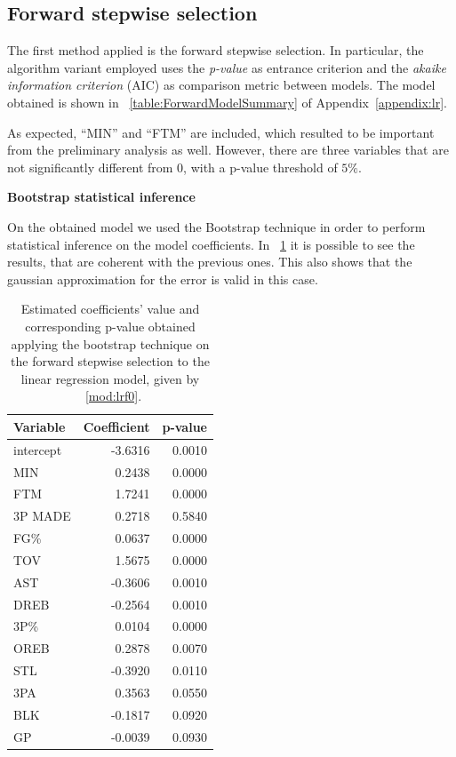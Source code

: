 \subsection{Forward stepwise selection}

The first method applied is the forward stepwise selection. In particular, the algorithm variant employed uses the \textit{p-value} as entrance criterion and the \textit{akaike information criterion} (AIC) as comparison metric between models. The model obtained is shown in \Tab~\ref{table:ForwardModelSummary} of Appendix~\ref{appendix:lr}.

As expected, ``MIN'' and ``FTM'' are included, which resulted to be important from the preliminary analysis as well. However, there are three variables that are not significantly different from 0, with a p-value threshold of $5\%$.

\vspace{0.2cm}
\noindent
\textbf{Bootstrap statistical inference}

On the obtained model we used the Bootstrap technique in order to perform statistical inference on the model coefficients. In \Tab~\ref{table:BootForwardModel} it is possible to see the results, that are coherent with the previous ones. This also shows that the gaussian approximation for the error is valid in this case. 

\begin{table}[h]
	\centering
	\begin{tabular}{|| l | r | r ||} 
		\hline
		Variable & Coefficient & p-value \\
		\hline
		\hline
		intercept & -3.6316 & 0.0010 \\
		MIN & 0.2438 & 0.0000 \\
		FTM & 1.7241 & 0.0000 \\
		3P MADE & 0.2718 & 0.5840 \\
		FG\% & 0.0637 & 0.0000 \\
		TOV & 1.5675 & 0.0000 \\
		AST & -0.3606 & 0.0010 \\
		DREB & -0.2564 & 0.0010 \\
		3P\% & 0.0104 & 0.0000 \\
		OREB & 0.2878 & 0.0070 \\
		STL & -0.3920 & 0.0110 \\
		3PA & 0.3563 & 0.0550 \\
		BLK & -0.1817 & 0.0920 \\
		GP & -0.0039 & 0.0930 \\
		\hline
	\end{tabular}
	\caption{Estimated coefficients' value and corresponding p-value obtained applying the bootstrap technique on the forward stepwise selection to the linear regression model, given by \Mod~\ref{mod:lrf0}.}
	\label{table:BootForwardModel}
\end{table}


